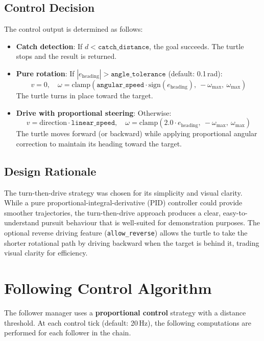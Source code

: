 \subsection{Control Decision}

The control output is determined as follows:

\begin{itemize}
  \item \textbf{Catch detection}: If $d < \texttt{catch\_distance}$, the goal succeeds. The turtle stops and the result is returned.

  \item \textbf{Pure rotation}: If $|e_{\text{heading}}| > \texttt{angle\_tolerance}$ (default: 0.1\,rad):
  \[
    v = 0, \quad \omega = \text{clamp}(\texttt{angular\_speed} \cdot \text{sign}(e_{\text{heading}}),\ -\omega_{\max},\ \omega_{\max})
  \]
  The turtle turns in place toward the target.

  \item \textbf{Drive with proportional steering}: Otherwise:
  \[
    v = \text{direction} \cdot \texttt{linear\_speed}, \quad \omega = \text{clamp}(2.0 \cdot e_{\text{heading}},\ -\omega_{\max},\ \omega_{\max})
  \]
  The turtle moves forward (or backward) while applying proportional angular correction to maintain its heading toward the target.
\end{itemize}

\subsection{Design Rationale}

The turn-then-drive strategy was chosen for its simplicity and visual clarity. While a pure proportional-integral-derivative (PID) controller could provide smoother trajectories, the turn-then-drive approach produces a clear, easy-to-understand pursuit behaviour that is well-suited for demonstration purposes. The optional reverse driving feature (\texttt{allow\_reverse}) allows the turtle to take the shorter rotational path by driving backward when the target is behind it, trading visual clarity for efficiency.

\section{Following Control Algorithm}

The follower manager uses a \textbf{proportional control} strategy with a distance threshold. At each control tick (default: 20\,Hz), the following computations are performed for each follower in the chain.

